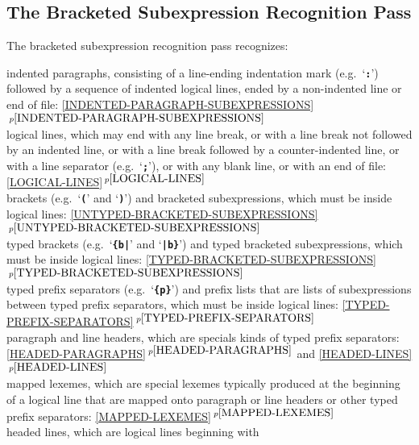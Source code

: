 \documentclass[12pt]{article}
\newcommand{\TT}[1]{{\tt \bfseries #1}}
\newcommand{\itemref}[1]{\ref{#1}$\,^{p\pageref{#1}}$}
\newenvironment{indpar}[1][0.3in]%
	{\begin{list}{}%
		     {\setlength{\itemsep}{0in}%
		      \setlength{\topsep}{0in}%
		      \setlength{\parsep}{1ex}%
		      \setlength{\labelwidth}{#1}%
		      \setlength{\leftmargin}{#1}%
		      \addtolength{\leftmargin}{\labelsep}}%
	 \item}%
	{\end{list}}
\begin{document}
\subsection{The Bracketed Subexpression Recognition Pass}
\label{BRACKETED-SUBEXPRESSION-RECOGNITION-PASS}

The bracketed subexpression recognition pass recognizes:
\begin{indpar}[0.5in]
\hspace*{-0.2in}indented paragraphs, consisting of a line-ending
    indentation mark (e.g.~`\TT{:}') followed by a sequence of
    indented logical lines, ended by a non-indented line or end
    of file: \itemref{INDENTED-PARAGRAPH-SUBEXPRESSIONS}
\\[0.5ex]
\hspace*{-0.2in}logical lines, which may end with any line break,
    or with a line break not followed by an indented line,
    or with a line break followed by a counter-indented line,
    or with a line separator (e.g.~`\TT{;}'),
    or with any blank line, or with an end of file:
    \itemref{LOGICAL-LINES}
\\[0.5ex]
\hspace*{-0.2in}brackets (e.g.~`\TT{(}' and `\TT{)}')
    and bracketed subexpressions, which must be inside logical lines:
    \itemref{UNTYPED-BRACKETED-SUBEXPRESSIONS}
\\[0.5ex]
\hspace*{-0.2in}typed brackets (e.g.~`\TT{\{b|}' and `\TT{|b\}}')
    and typed bracketed subexpressions, which must be inside logical lines:
    \itemref{TYPED-BRACKETED-SUBEXPRESSIONS}
\\[0.5ex]
\hspace*{-0.2in}typed prefix separators (e.g.~`\TT{\{p\}}')
    and prefix lists that are lists of subexpressions between
    typed prefix separators, which must be inside logical lines:
    \itemref{TYPED-PREFIX-SEPARATORS}
\\[0.5ex]
\hspace*{-0.2in}paragraph and line headers, which are specials kinds of
    typed prefix separators:
    \itemref{HEADED-PARAGRAPHS} and \itemref{HEADED-LINES}
\\[0.5ex]
\hspace*{-0.2in}mapped lexemes, which are special lexemes typically
    produced at the beginning of a logical line that are mapped onto
    paragraph or line headers or other typed prefix separators:
    \itemref{MAPPED-LEXEMES}
\\[0.5ex]
\hspace*{-0.2in}headed lines, which are logical lines beginning with

\end{indpar}
\end{document}

